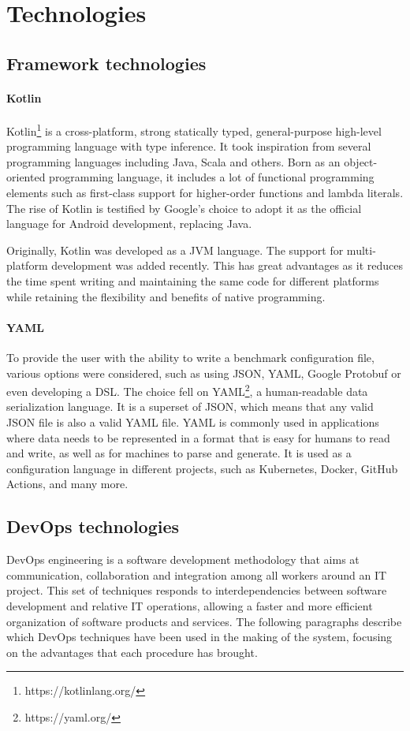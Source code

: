 \documentclass[12pt,a4paper,openright,twoside]{book}
\begin{document}
\section{Technologies}

\subsection{Framework technologies}

\paragraph*{Kotlin}

Kotlin\footnote{https://kotlinlang.org/} is a cross-platform, strong statically typed, general-purpose high-level programming language with type inference.
It took inspiration from several programming languages including Java, Scala and others.
Born as an object-oriented programming language, it includes a lot of functional programming elements such as first-class support for higher-order functions and lambda literals.
The rise of Kotlin is testified by Google's choice to adopt it as the official language for Android development, replacing Java.

Originally, Kotlin was developed as a JVM language. The support for multi-platform development was added recently. 
This has great advantages as it reduces the time spent writing and maintaining the same code for different platforms while retaining the flexibility and benefits of native programming.

\paragraph*{YAML}
To provide the user with the ability to write a benchmark configuration file, various options were considered, such as using JSON, YAML, Google Protobuf or even developing a DSL. 
The choice fell on YAML\footnote{https://yaml.org/}, a human-readable data serialization language. It is a superset of JSON, which means that any valid JSON file is also a valid YAML file.
YAML is commonly used in applications where data needs to be represented in a format that is easy for humans to read and write, as well as for machines to parse and generate.
It is used as a configuration language in different projects, such as Kubernetes, Docker, GitHub Actions, and many more.

\subsection{DevOps technologies}
DevOps engineering is a software development methodology that aims at communication, collaboration and integration among all workers around an IT project. 
This set of techniques responds to interdependencies between software development and relative IT operations, allowing a faster and more efficient organization of software products and services.
The following paragraphs describe which DevOps techniques have been used in the making of the system, focusing on the advantages that each procedure has brought.
\end{document}
